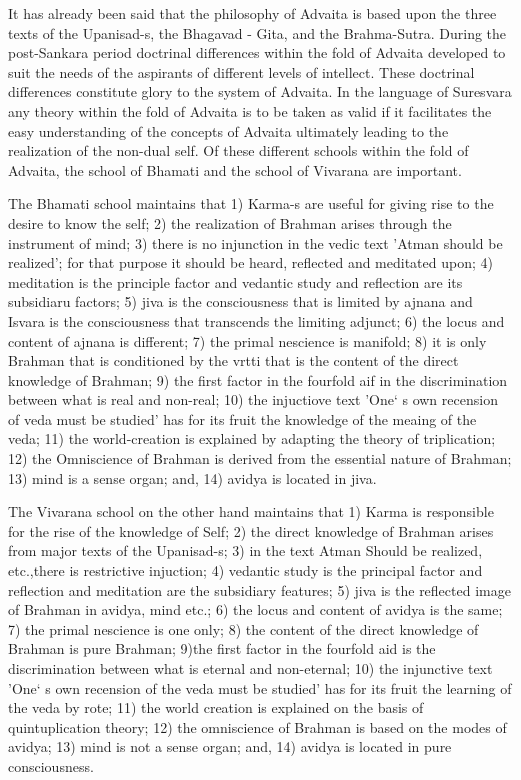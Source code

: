 It has already been said that the philosophy of Advaita is based upon the three texts of the Upanisad-s, the Bhagavad - Gita, and the Brahma-Sutra. During the post-Sankara period doctrinal differences within the fold of Advaita developed to suit the needs of the aspirants of different levels of intellect. These doctrinal differences constitute glory to the system of Advaita. In the language of Suresvara any theory within the fold of Advaita is to be taken as valid if it facilitates the easy understanding of the concepts of Advaita ultimately leading to the realization of the non-dual self. Of these different schools within the fold of Advaita, the school of Bhamati and the school of Vivarana are important. 

The Bhamati school maintains that 1) Karma-s are useful for giving rise to the desire to know the self; 2) the realization of Brahman arises through the instrument of mind; 3) there is no injunction in the vedic text 'Atman should be realized'; for that purpose it should be heard, reflected and meditated upon; 4) meditation is the principle factor and vedantic study and reflection are its subsidiaru factors; 5) jiva is the consciousness that is limited by ajnana and Isvara is the consciousness that transcends the limiting adjunct; 6) the locus and content of ajnana is different; 7) the primal nescience is manifold; 8) it is only Brahman that is conditioned by the vrtti that is the content of the direct knowledge of Brahman; 9) the first factor in the fourfold aif in the discrimination between what is real and non-real; 10) the injuctiove text 'One` s own recension of veda must be studied' has for its fruit the knowledge of the meaing of the veda; 11) the world-creation is explained by adapting the theory of triplication; 12) the Omniscience of Brahman is derived from the essential nature of Brahman; 13) mind is a sense organ; and, 14) avidya is located in jiva. 

The Vivarana school on the other hand maintains that 1) Karma is responsible for the rise of the knowledge of Self; 2) the direct knowledge of Brahman arises from major texts of the Upanisad-s; 3) in the text Atman Should be realized, etc.,there is restrictive injuction; 4) vedantic study is the principal factor and reflection and meditation are the subsidiary features; 5) jiva is the reflected image of Brahman in avidya, mind etc.; 6) the locus and content of avidya is the same; 7) the primal nescience is one only; 8) the content of the direct knowledge of Brahman is pure Brahman; 9)the first factor in the fourfold aid is the discrimination between what is eternal and non-eternal; 10) the injunctive text 'One` s own recension of the veda must be studied' has for its fruit the learning of the veda by rote; 11) the world creation is explained on the basis of quintuplication theory; 12) the omniscience of Brahman is based on the modes of avidya;  13) mind is not a sense organ; and, 14) avidya is located in pure consciousness.

